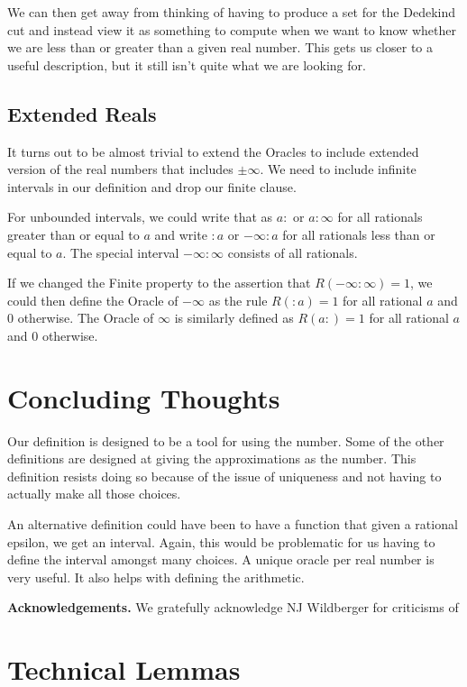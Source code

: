 \documentclass[12pt]{article}
\theoremstyle{remark}
\begin{document}
We can then get away from thinking of having to produce a set for the Dedekind
cut and instead view it as something to compute when we want to know whether
we are less than or greater than a given real number. This gets us closer to a
useful description, but it still isn't quite what we are looking for. 

\subsection{Extended Reals}

It turns out to be almost trivial to extend the Oracles to include extended version of the real numbers that includes $\pm \infty$. We need to include infinite intervals in our definition and drop our finite clause.

For unbounded intervals, we could write that as $a:$ or $a:\infty$ for all rationals greater than or equal to $a$ and write $:a$ or $-\infty:a$ for all rationals less than or equal to $a$. The special interval $-\infty:\infty$ consists of all rationals. 

If we changed the Finite property to the assertion that $R(-\infty:\infty)=1$, we could then define the Oracle of $-\infty$ as the rule $R(:a) = 1$ for all rational $a$ and 0 otherwise. The Oracle of $\infty$ is similarly defined as $R(a:)=1$  for all rational $a$ and 0 otherwise. 


\section{Concluding Thoughts}

Our definition is designed to be a tool for using the number. Some of the other definitions are designed at giving the approximations as the number. This definition resists doing so because of the issue of uniqueness and not having to actually make all those choices. 

An alternative definition could have been to have a function that given a rational epsilon, we get an interval. Again, this would be problematic for us having to define the interval amongst many choices. A unique oracle per real number is very useful. It also helps with defining the arithmetic. 


\bigskip

\noindent \textbf{Acknowledgements. } We gratefully acknowledge NJ Wildberger for criticisms of 

\appendix

\section{Technical Lemmas}
\end{document}
